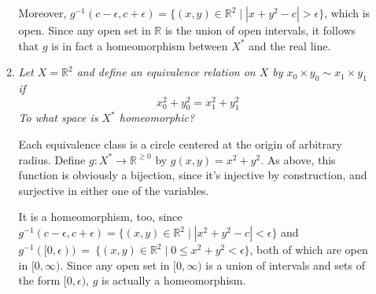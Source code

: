\documentclass[10pt]{article}
\newcommand{\R}{\mathbb{R}}
\begin{document}
\begin{enumerate}
\begin{enumerate}
Moreover, $g^{-1}(c - \epsilon, c + \epsilon) = \{(x,y) \in \R^2 \mid |x+y^2 - c| > \epsilon \}$, which is open.  Since any open set in $\R$ is the union of open intervals, it follows that $g$ is in fact a homeomorphism between $X^\ast$ and the real line.

\item \emph{Let $X = \R^2$ and define an equivalence relation on $X$ by $x_0 \times y_0 \sim x_1 \times y_1$ if $$x_0^2 + y_0^2 = x_1^2 + y_1^2$$  To what space is $X^\ast$ homeomorphic?}

Each equivalence class is a circle centered at the origin of arbitrary radius.  Define $g: X^\ast \rightarrow \R^{\geq 0}$ by $g(x,y) = x^2 + y^2$.  As above, this function is obviously a bijection, since it's injective by construction, and surjective in either one of the variables.  

It is a homeomorphism, too, since $g^{-1}(c - \epsilon, c + \epsilon) = \{ (x,y) \in \R^2 \mid |x^2 + y^2  - c| < \epsilon \}$ and $g^{-1}([0, \epsilon))~=~\{(x,y) \in \R^2 \mid 0 \leq x^2 + y^2 < \epsilon\}$, both of which are open in $[0, \infty)$.  Since any open set in $[0, \infty)$ is a union of intervals and sets of the form $[0,\epsilon)$, $g$ is actually a homeomorphism.

\end{enumerate}

\end{enumerate}
\end{document}
